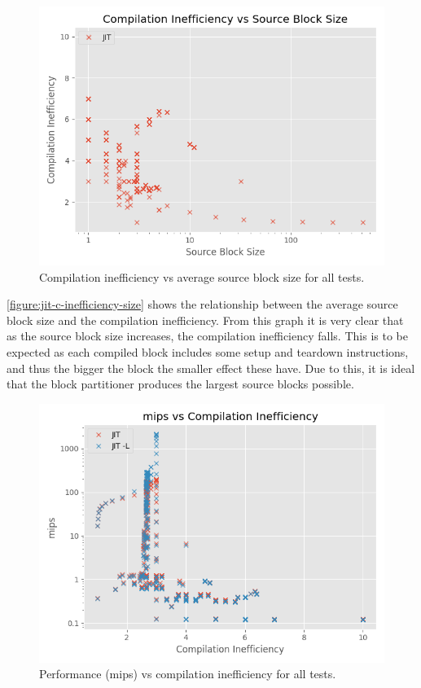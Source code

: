 \begin{figure}[H]
    \centering
    \includegraphics[scale=0.75]{output/graphs/scatter/single/jit/c-efficiency-vs-hotness.png}
    \caption{Compilation inefficiency vs average source block size for all tests.}
    \label{figure:jit-c-inefficiency-size}
\end{figure}

\autoref{figure:jit-c-inefficiency-size} shows the relationship between the average source block size and the compilation inefficiency. From this graph it is very clear that as the source block size increases, the compilation inefficiency falls. This is to be expected as each compiled block includes some setup and teardown instructions, and thus the bigger the block the smaller effect these have. Due to this, it is ideal that the block partitioner produces the largest source blocks possible.

\begin{figure}[H]
    \centering
    \includegraphics[scale=0.75]{output/graphs/scatter/jit/c-efficiency-vs-mips.png}
    \caption{Performance (mips) vs compilation inefficiency for all tests.}
    \label{figure:jit-c-inefficiency-mips}
\end{figure}


